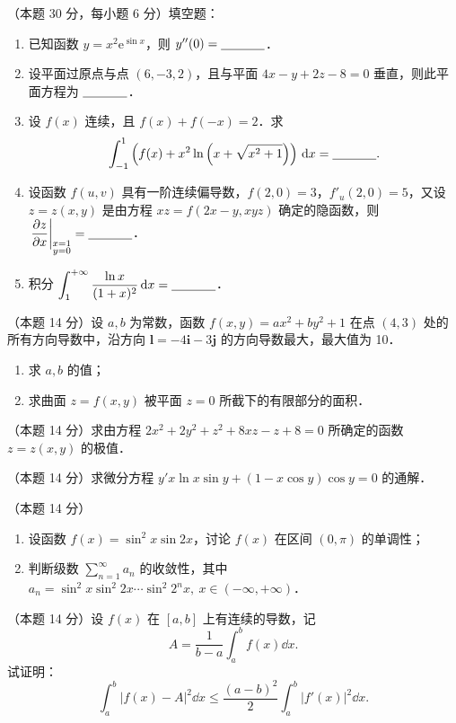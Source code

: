 
\begin{problems}
\item[一、]（本题 30 分，每小题 6 分）填空题：
\begin{enumerate}
  \item 已知函数 $y=x^2\mathrm{e}^{\sin x}$，则 $y''(0)=\underline{\hspace{3.5em}}$．
  \item 设平面过原点与点 $(6,-3,2)$，且与平面 $4x-y+2z-8=0$ 垂直，则此平面方程为 $\underline{\hspace{3.5em}}$．
  \item 设 $f(x)$ 连续，且 $f(x)+f(-x)=2$．求
  \[
  \int_{-1}^{1}\left(f(x)+x^2\ln\left(x+\sqrt{x^2+1}\right)\right)\,\mathrm{d} x=\underline{\hspace{3.5em}}.
  \]
  \item 设函数 $f(u,v)$ 具有一阶连续偏导数，$f(2,0)=3$，$f'_u(2,0)=5$，又设 $z=z(x,y)$ 是由方程 $xz=f(2x-y,xyz)$ 确定的隐函数，则 $\displaystyle \left.\frac{\partial z}{\partial x}\right|_{\substack{x=1\\y=0}}=\underline{\hspace{3.5em}}$．
  \item 积分 $\displaystyle \int_1^{+\infty}\frac{\ln x}{(1+x)^2}\,\mathrm{d} x=\underline{\hspace{3.5em}}$．
\end{enumerate}

\item[二、]（本题 14 分）设 $a,b$ 为常数，函数 $f(x,y)=ax^2+by^2+1$ 在点 $(4,3)$ 处的所有方向导数中，沿方向 $\mathbf{l}=-4\mathbf{i}-3\mathbf{j}$ 的方向导数最大，最大值为 10．
\begin{enumerate}
  \item 求 $a,b$ 的值；
  \item 求曲面 $z=f(x,y)$ 被平面 $z=0$ 所截下的有限部分的面积．
\end{enumerate}

\item[三、]（本题 14 分）求由方程 $2x^2+2y^2+z^2+8xz-z+8=0$ 所确定的函数 $z=z(x,y)$ 的极值．

\item[四、]（本题 14 分）求微分方程 $y'x\ln x\sin y+(1-x\cos y)\cos y=0$ 的通解．

\item[五、]（本题 14 分）
\begin{enumerate}
  \item 设函数 $f(x)=\sin^2 x\sin 2x$，讨论 $f(x)$ 在区间 $(0,\pi)$ 的单调性；
  \item 判断级数 $\displaystyle \sum_{n=1}^{\infty}a_n$ 的收敛性，其中 $a_n=\sin^2 x\sin^2 2x\cdots\sin^2 2^n x,\ x\in(-\infty,+\infty)$．
\end{enumerate}

\item[六、]（本题 14 分）设 $f(x)$ 在 $[a,b]$ 上有连续的导数，记
\[
A=\frac{1}{b-a}\int_a^b f(x)\dd x.
\]
试证明：
\[
\int_a^b |f(x)-A|^2\dd x\le\frac{(a-b)^2}{2}\int_a^b |f'(x)|^2\dd x.
\]
\end{problems}
